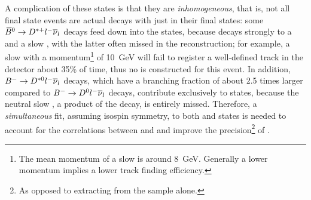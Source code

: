 A complication of these states is that they are \emph{inhomogeneous},
that is, not all \Dz\mun final state events are actual decays with just \Dz\mun
in their final states:
some ${{\kern 0.18em\overline{\kern -0.18em B}}{}^0} \rightarrow {\ensuremath{{D}^{*+}}}{\ensuremath{l^-}}{\ensuremath{{\overline{\nu}}_l}}$ decays feed down into the \Dz\mun
states,
because \Dstarp decays strongly to a \Dz and a slow \pip,
with the latter often missed in the reconstruction;
for example, a slow \pip with a momentum\footnote{
    The mean momentum of a slow \pip is around 8~GeV.
    Generally a lower momentum implies a lower track finding efficiency.
} of 10~GeV will fail to register a
well-defined track in the detector about 35\% of time,
thus no \Dstarp is constructed for this event.
In addition, ${{{B}^-}} \rightarrow {\ensuremath{{D}^{*0}}}{\ensuremath{l^-}}{\ensuremath{{\overline{\nu}}_l}}$ decays,
which have a branching fraction of about 2.5 times larger compared to
${{{B}^-}} \rightarrow {\ensuremath{{D}^0}}{\ensuremath{l^-}}{\ensuremath{{\overline{\nu}}_l}}$ decays,
contribute exclusively to \Dz\mun states, because the neutral slow
\piz, a product of the \Dstarz decay, is entirely missed.
Therefore, a \emph{simultaneous} fit,
assuming isospin symmetry,
to both \Dstarp\mun and \Dz\mun states is needed to
account for the correlations between \RD and \RDst and improve the
precision\footnote{
    As opposed to extracting \RDst from the \Dstarp\mun sample alone.
} of \RDst.


